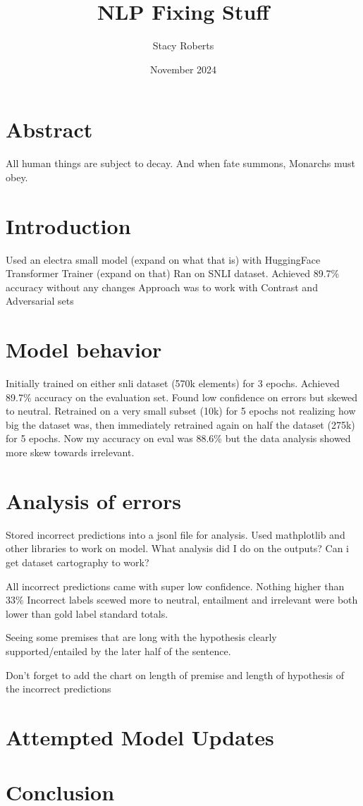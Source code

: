 \documentclass{article}
\title{NLP Fixing Stuff}
\author{Stacy Roberts}
\date{November 2024}
\begin{document}
\maketitle

\begin{multicols*}{2}

\section*{Abstract}
All human things are subject to decay. And when fate summons, Monarchs must obey.

\section*{Introduction}

Used an electra small model (expand on what that is) with HuggingFace Transformer Trainer (expand on that)
Ran on SNLI dataset. Achieved 89.7\% accuracy without any changes
Approach was to work with Contrast and Adversarial sets

\section*{Model behavior}

Initially trained on either snli dataset (570k elements) for 3 epochs. Achieved 89.7\% accuracy on the evaluation set. Found low confidence on errors but skewed to neutral.
Retrained on a very small subset (10k) for 5 epochs not realizing how big the dataset was, then immediately retrained again on half the dataset (275k) for 5 epochs. Now my accuracy on eval was 88.6\% but the data analysis showed more skew towards irrelevant.

\section*{Analysis of errors}

Stored incorrect predictions into a jsonl file for analysis. Used mathplotlib and other libraries to work on model.
What analysis did I do on the outputs? Can i get dataset cartography to work?

All incorrect predictions came with super low confidence. Nothing higher than 33\%
Incorrect labels scewed more to neutral, entailment and irrelevant were both lower than gold label standard totals.

Seeing some premises that are long with the hypothesis clearly supported/entailed by the later half of the sentence. 

Don't forget to add the chart on length of premise and length of hypothesis of the incorrect predictions
\section*{Attempted Model Updates}

\section*{Conclusion}



\end{multicols*}
\end{document}
